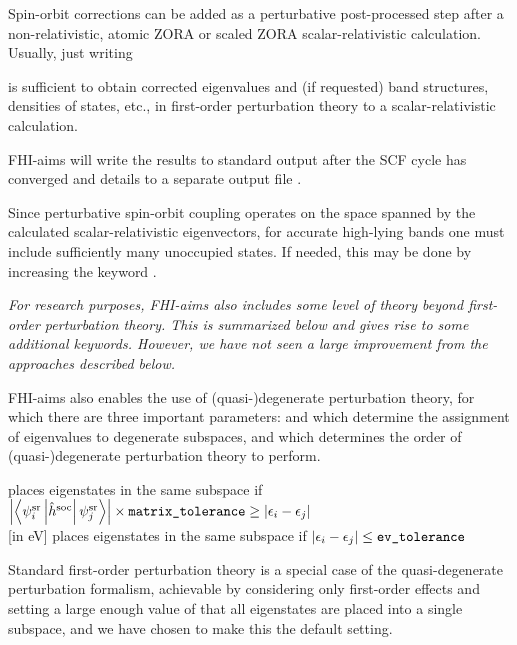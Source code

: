 Spin-orbit corrections can be added as a perturbative post-processed
step after a non-relativistic, atomic ZORA or scaled ZORA
scalar-relativistic calculation. Usually, just writing

   

is sufficient to obtain corrected eigenvalues and (if requested) band
structures, densities of states, etc., in first-order perturbation
theory to a scalar-relativistic calculation.

FHI-aims will write the results to standard output after the SCF cycle
has converged and details to a separate output file
.  

Since perturbative spin-orbit coupling operates
on the space spanned by the calculated scalar-relativistic
eigenvectors, for accurate high-lying bands one must include
sufficiently many unoccupied states. If needed, this may be done by
increasing the keyword . 

\emph{For research purposes, FHI-aims also includes some level of theory
beyond first-order perturbation theory. This is summarized below and
gives rise to some additional keywords. However, we have not seen a
large improvement from the approaches described below.}

FHI-aims also enables the use of (quasi-)degenerate perturbation
theory, for which there are three important parameters:
 and  which  
determine the assignment of eigenvalues to degenerate subspaces, and  which determines the 
order of (quasi-)degenerate perturbation theory to perform. 
 
 places eigenstates in the same subspace if \\ 
    $\left|\left<\psi_i^\text{sr}\left|\hat{h}^\text{soc}\right|\psi_j^\text{sr}\right>\right|\times
    \texttt{matrix\_tolerance}\ge \left|\epsilon_i-\epsilon_j\right|$ \\
 [in eV] places eigenstates in the same subspace if 
    $\left|\epsilon_i-\epsilon_j\right| \le \texttt{ev\_tolerance}$

Standard first-order perturbation theory is a special case of the
quasi-degenerate perturbation formalism, achievable by considering
only first-order effects and setting a large enough value of
 that all eigenstates are placed into a single
subspace, and we have chosen to make this the default setting. 

